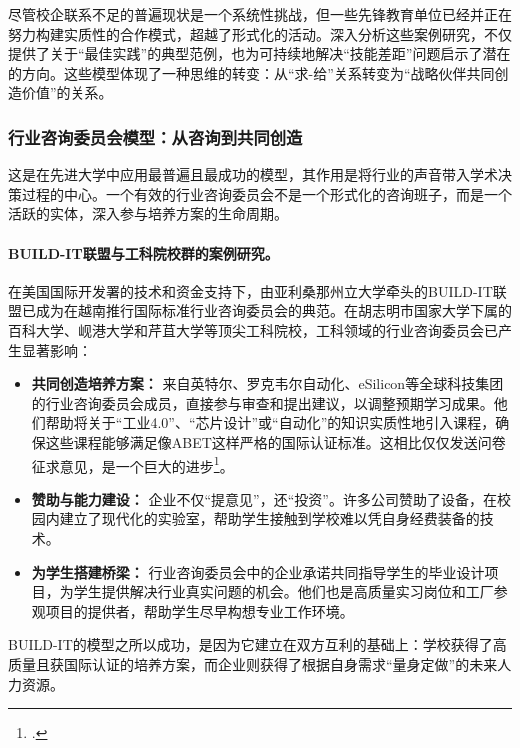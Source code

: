尽管校企联系不足的普遍现状是一个系统性挑战，但一些先锋教育单位已经并正在努力构建实质性的合作模式，超越了形式化的活动。深入分析这些案例研究，不仅提供了关于“最佳实践”的典型范例，也为可持续地解决“技能差距”问题启示了潜在的方向。这些模型体现了一种思维的转变：从“求-给”关系转变为“战略伙伴共同创造价值”的关系。

\subsubsection{行业咨询委员会模型：从咨询到共同创造}
这是在先进大学中应用最普遍且最成功的模型，其作用是将行业的声音带入学术决策过程的中心。一个有效的行业咨询委员会不是一个形式化的咨询班子，而是一个活跃的实体，深入参与培养方案的生命周期。

\paragraph{BUILD-IT联盟与工科院校群的案例研究。} 在美国国际开发署的技术和资金支持下，由亚利桑那州立大学牵头的BUILD-IT联盟已成为在越南推行国际标准行业咨询委员会的典范。在胡志明市国家大学下属的百科大学、岘港大学和芹苴大学等顶尖工科院校，工科领域的行业咨询委员会已产生显著影响：
\begin{itemize}
    \item \textbf{共同创造培养方案：} 来自英特尔、罗克韦尔自动化、eSilicon等全球科技集团的行业咨询委员会成员，直接参与审查和提出建议，以调整预期学习成果。他们帮助将关于“工业4.0”、“芯片设计”或“自动化”的知识实质性地引入课程，确保这些课程能够满足像ABET这样严格的国际认证标准。这相比仅仅发送问卷征求意见，是一个巨大的进步\footcite{buildit_iab_impact}。
    \item \textbf{赞助与能力建设：} 企业不仅“提意见”，还“投资”。许多公司赞助了设备，在校园内建立了现代化的实验室，帮助学生接触到学校难以凭自身经费装备的技术。
    \item \textbf{为学生搭建桥梁：} 行业咨询委员会中的企业承诺共同指导学生的毕业设计项目，为学生提供解决行业真实问题的机会。他们也是高质量实习岗位和工厂参观项目的提供者，帮助学生尽早构想专业工作环境。
\end{itemize}
BUILD-IT的模型之所以成功，是因为它建立在双方互利的基础上：学校获得了高质量且获国际认证的培养方案，而企业则获得了根据自身需求“量身定做”的未来人力资源。


